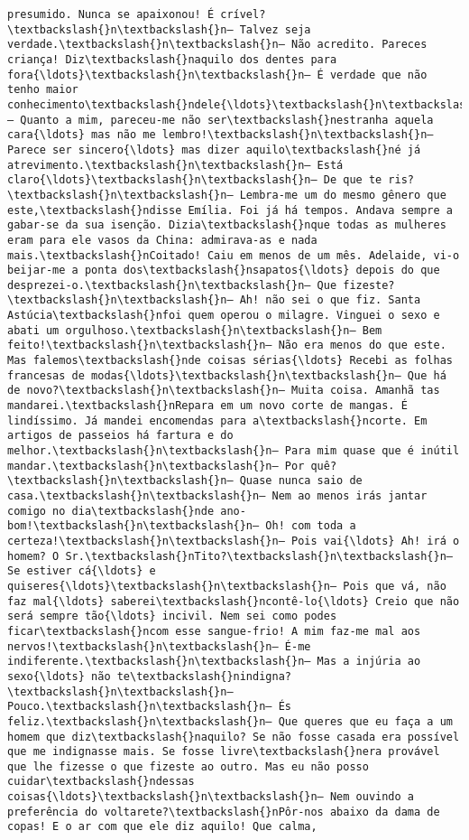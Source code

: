\begin{Verbatim}[commandchars=\\\{\}]
presumido. Nunca se apaixonou! É crível?\textbackslash{}n\textbackslash{}n— Talvez seja verdade.\textbackslash{}n\textbackslash{}n— Não acredito. Pareces criança! Diz\textbackslash{}naquilo dos dentes para fora{\ldots}\textbackslash{}n\textbackslash{}n— É verdade que não tenho maior conhecimento\textbackslash{}ndele{\ldots}\textbackslash{}n\textbackslash{}n— Quanto a mim, pareceu-me não ser\textbackslash{}nestranha aquela cara{\ldots} mas não me lembro!\textbackslash{}n\textbackslash{}n— Parece ser sincero{\ldots} mas dizer aquilo\textbackslash{}né já atrevimento.\textbackslash{}n\textbackslash{}n— Está claro{\ldots}\textbackslash{}n\textbackslash{}n— De que te ris?\textbackslash{}n\textbackslash{}n— Lembra-me um do mesmo gênero que este,\textbackslash{}ndisse Emília. Foi já há tempos. Andava sempre a gabar-se da sua isenção. Dizia\textbackslash{}nque todas as mulheres eram para ele vasos da China: admirava-as e nada mais.\textbackslash{}nCoitado! Caiu em menos de um mês. Adelaide, vi-o beijar-me a ponta dos\textbackslash{}nsapatos{\ldots} depois do que desprezei-o.\textbackslash{}n\textbackslash{}n— Que fizeste?\textbackslash{}n\textbackslash{}n— Ah! não sei o que fiz. Santa Astúcia\textbackslash{}nfoi quem operou o milagre. Vinguei o sexo e abati um orgulhoso.\textbackslash{}n\textbackslash{}n— Bem feito!\textbackslash{}n\textbackslash{}n— Não era menos do que este. Mas falemos\textbackslash{}nde coisas sérias{\ldots} Recebi as folhas francesas de modas{\ldots}\textbackslash{}n\textbackslash{}n— Que há de novo?\textbackslash{}n\textbackslash{}n— Muita coisa. Amanhã tas mandarei.\textbackslash{}nRepara em um novo corte de mangas. É lindíssimo. Já mandei encomendas para a\textbackslash{}ncorte. Em artigos de passeios há fartura e do melhor.\textbackslash{}n\textbackslash{}n— Para mim quase que é inútil mandar.\textbackslash{}n\textbackslash{}n— Por quê?\textbackslash{}n\textbackslash{}n— Quase nunca saio de casa.\textbackslash{}n\textbackslash{}n— Nem ao menos irás jantar comigo no dia\textbackslash{}nde ano-bom!\textbackslash{}n\textbackslash{}n— Oh! com toda a certeza!\textbackslash{}n\textbackslash{}n— Pois vai{\ldots} Ah! irá o homem? O Sr.\textbackslash{}nTito?\textbackslash{}n\textbackslash{}n— Se estiver cá{\ldots} e quiseres{\ldots}\textbackslash{}n\textbackslash{}n— Pois que vá, não faz mal{\ldots} saberei\textbackslash{}ncontê-lo{\ldots} Creio que não será sempre tão{\ldots} incivil. Nem sei como podes ficar\textbackslash{}ncom esse sangue-frio! A mim faz-me mal aos nervos!\textbackslash{}n\textbackslash{}n— É-me indiferente.\textbackslash{}n\textbackslash{}n— Mas a injúria ao sexo{\ldots} não te\textbackslash{}nindigna?\textbackslash{}n\textbackslash{}n— Pouco.\textbackslash{}n\textbackslash{}n— És feliz.\textbackslash{}n\textbackslash{}n— Que queres que eu faça a um homem que diz\textbackslash{}naquilo? Se não fosse casada era possível que me indignasse mais. Se fosse livre\textbackslash{}nera provável que lhe fizesse o que fizeste ao outro. Mas eu não posso cuidar\textbackslash{}ndessas coisas{\ldots}\textbackslash{}n\textbackslash{}n— Nem ouvindo a preferência do voltarete?\textbackslash{}nPôr-nos abaixo da dama de copas! E o ar com que ele diz aquilo! Que calma, 
\end{Verbatim}

